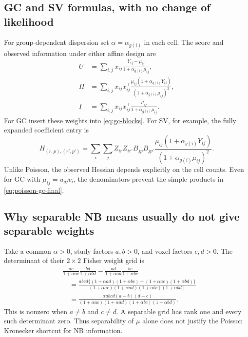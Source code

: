 \documentclass[11pt,a4paper]{article}
\numberwithin{equation}{section}
\begin{document}
\subsection{GC and SV formulas, with no change of likelihood}
For group-dependent dispersion set $\alpha=\alpha_{g(i)}$ in each cell.
The score and observed information under either affine design are
\begin{align}
 U&=\sum_{i,j}x_{ij}\frac{Y_{ij}-\mu_{ij}}
                                   {1+\alpha_{g(i)}\mu_{ij}},\\
 H&=\sum_{i,j}x_{ij}x_{ij}^\top
       \frac{\mu_{ij}(1+\alpha_{g(i)}Y_{ij})}
            {(1+\alpha_{g(i)}\mu_{ij})^2},\\
 I&=\sum_{i,j}x_{ij}x_{ij}^\top
                       \frac{\mu_{ij}}{1+\alpha_{g(i)}\mu_{ij}}.
 \label{eq:independent-nb-assembled}
\end{align}
For GC insert these weights into \eqref{eq:gc-blocks}.
For SV, for example, the fully expanded coefficient entry is
\begin{equation}
 H_{(r,p),(r',p')}=
 \sum_i\sum_j Z_{ir}Z_{ir'}B_{jp}B_{jp'}
 \frac{\mu_{ij}(1+\alpha_{g(i)}Y_{ij})}
      {(1+\alpha_{g(i)}\mu_{ij})^2}.
\end{equation}
Unlike Poisson, the observed Hessian depends explicitly on the cell counts.
Even for GC with $\mu_{ij}=u_{gj}v_i$, the denominators prevent
the simple products in \eqref{eq:poisson-gc-final}.

\subsection{Why separable NB means usually do not give separable weights}
Take a common $\alpha>0$, study factors $a,b>0$, and voxel factors
$c,d>0$. The determinant of their $2\times2$ Fisher weight grid is
\begin{align}
 &\frac{ac}{1+\alpha ac}\frac{bd}{1+\alpha bd}
   -\frac{ad}{1+\alpha ad}\frac{bc}{1+\alpha bc}\\
 &\quad=\frac{abcd\{(1+\alpha ad)(1+\alpha bc)
                       -(1+\alpha ac)(1+\alpha bd)\}}
              {(1+\alpha ac)(1+\alpha ad)(1+\alpha bc)(1+\alpha bd)}\\
 &\quad=\frac{\alpha abcd(a-b)(d-c)}
              {(1+\alpha ac)(1+\alpha ad)(1+\alpha bc)(1+\alpha bd)}.
\end{align}
This is nonzero when $a\ne b$ and $c\ne d$.
A separable grid has rank one and every such determinant zero.
Thus separability of $\mu$ alone does not justify the Poisson
Kronecker shortcut for NB information.
\end{document}
